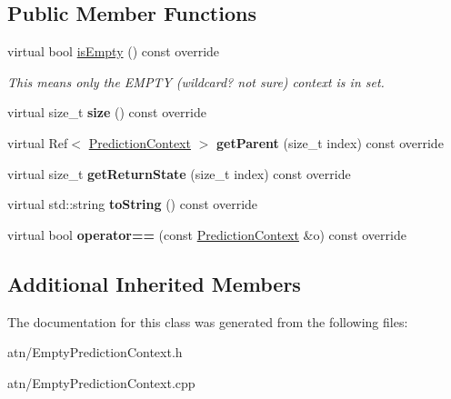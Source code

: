\subsection*{Public Member Functions}
\begin{DoxyCompactItemize}
\item 
\mbox{\label{classantlr4_1_1atn_1_1EmptyPredictionContext_a0216ff499b88ca1443ae9e720541b5ce}} 
virtual bool \hyperlink{classantlr4_1_1atn_1_1EmptyPredictionContext_a0216ff499b88ca1443ae9e720541b5ce}{is\+Empty} () const override
\begin{DoxyCompactList}\small\item\em This means only the E\+M\+P\+TY (wildcard? not sure) context is in set. \end{DoxyCompactList}\item 
\mbox{\label{classantlr4_1_1atn_1_1EmptyPredictionContext_a92d4e1c48bc9daf37cec387a06fc6fad}} 
virtual size\+\_\+t {\bfseries size} () const override
\item 
\mbox{\label{classantlr4_1_1atn_1_1EmptyPredictionContext_acd1aaea5711a69c01f23942a78e4678e}} 
virtual Ref$<$ \hyperlink{classantlr4_1_1atn_1_1PredictionContext}{Prediction\+Context} $>$ {\bfseries get\+Parent} (size\+\_\+t index) const override
\item 
\mbox{\label{classantlr4_1_1atn_1_1EmptyPredictionContext_a50f13a4b417ac47340985f3212fd81f1}} 
virtual size\+\_\+t {\bfseries get\+Return\+State} (size\+\_\+t index) const override
\item 
\mbox{\label{classantlr4_1_1atn_1_1EmptyPredictionContext_ad1e91bf65a589ebdfcefb9d719b3f991}} 
virtual std\+::string {\bfseries to\+String} () const override
\item 
\mbox{\label{classantlr4_1_1atn_1_1EmptyPredictionContext_a05692e3c3260fa7669c27b1cc531b780}} 
virtual bool {\bfseries operator==} (const \hyperlink{classantlr4_1_1atn_1_1PredictionContext}{Prediction\+Context} \&o) const override
\end{DoxyCompactItemize}
\subsection*{Additional Inherited Members}


The documentation for this class was generated from the following files\+:\begin{DoxyCompactItemize}
\item 
atn/Empty\+Prediction\+Context.\+h\item 
atn/Empty\+Prediction\+Context.\+cpp\end{DoxyCompactItemize}
